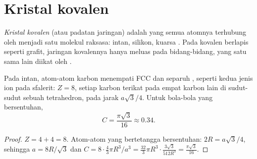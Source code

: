 \section{Kristal kovalen}

\begin{definition}\label{def:b1:crystals-ionic-covalent:covalent-crystal}
\emph{Kristal kovalen} (atau padatan jaringan)
adalah  yang semua atomnya terhubung oleh  menjadi
satu molekul raksasa: intan, silikon, kuarsa . Pada 
kovalen berlapis seperti grafit, jaringan kovalennya hanya meluas pada
bidang-bidang, yang satu sama lain diikat oleh .
\end{definition}

\begin{proposition}\label{prop:b1:crystals-ionic-covalent:diamond}
Pada intan, atom-atom karbon menempati  FCC dan separuh , seperti kedua jenis ion pada sfalerit: $Z = 8$, setiap
karbon terikat pada empat karbon lain di sudut-sudut sebuah tetrahedron,
pada jarak $a\sqrt3/4$. Untuk bola-bola yang bersentuhan, 
\[
  C = \frac{\pi\sqrt3}{16} \approx 0.34 .
\]
\end{proposition}

\begin{proof}
$Z = 4 + 4 = 8$. Atom-atom yang bertetangga bersentuhan: $2R = a\sqrt3/4$, sehingga $a =
8R/\sqrt3$ dan $C = 8 \cdot \frac43\pi R^3/a^3 = \frac{32}{3}\pi R^3 \cdot
\frac{3\sqrt3}{512 R^3} = \frac{\pi\sqrt3}{16}$.
\end{proof}

